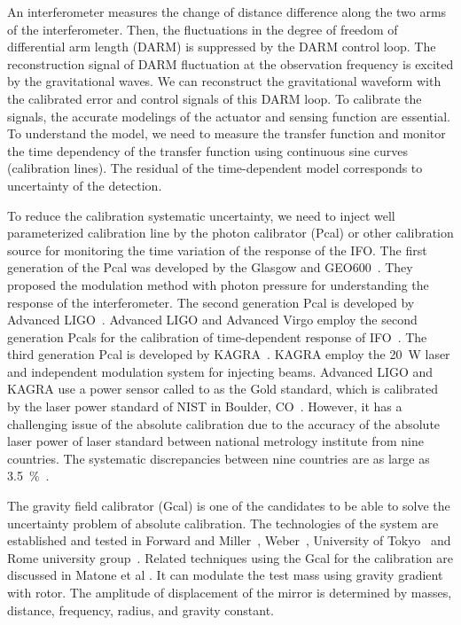 \documentclass[%
 reprint,
superscriptaddress,
 amsmath,amssymb,
 aps,
]{revtex4-1}
\begin{document}

An interferometer measures the change of distance difference along the two arms of the interferometer. Then, the fluctuations in the degree of freedom of differential arm length (DARM) is suppressed by the DARM control loop. The reconstruction signal of DARM fluctuation at the observation frequency is excited by the gravitational waves. We can reconstruct the gravitational waveform with the calibrated error and control signals of this DARM loop. To calibrate the signals, the accurate modelings of the actuator and sensing function are essential. To understand the model, we need to measure the transfer function and monitor the time dependency of the transfer function using continuous sine curves (calibration lines). The residual of the time-dependent model corresponds to uncertainty of the detection.

To reduce the calibration systematic uncertainty, we need to inject well parameterized calibration line by the photon calibrator (Pcal) or other calibration source for monitoring the time variation of the response of the IFO. The first generation of the Pcal was developed by the Glasgow and GEO600~\cite{CLUBLEY200185,MOSSAVI20061}. They proposed the modulation method with photon pressure for understanding the response of the interferometer. The second generation Pcal is developed by Advanced LIGO~\cite{doi:10.1063/1.4967303,0264-9381-27-8-084024,0264-9381-26-24-245011,0264-9381-32-2-024001}. Advanced LIGO and Advanced Virgo employ the second generation Pcals for the calibration of time-dependent response of IFO~\cite{0264-9381-32-2-024001}. The third generation Pcal is developed by KAGRA~\cite{KAGRA_Pcal}. KAGRA employ the 20~W laser and independent modulation system for injecting beams. Advanced LIGO and KAGRA use a power sensor called to as the Gold standard, which is calibrated by the laser power standard of NIST in Boulder, CO~\cite{taylor:1994:GEEU}. However, it has a challenging issue of the absolute calibration due to the accuracy of the absolute laser power of laser standard between national metrology institute from nine countries. The 
systematic discrepancies between nine countries are as large as 3.5~\%~\cite{EUROMET}.

The gravity field calibrator (Gcal) is one of the candidates to be able to solve the uncertainty problem of absolute calibration. The technologies of the system are established and tested in Forward and Miller~\cite{doi:10.1063/1.1709366}, Weber~\cite{PhysRevLett.18.795,PhysRev.167.1145}, University of Tokyo~\cite{Hirakawa,1347-4065-19-3-L123,1347-4065-20-7-L498,PhysRevD.26.729,PhysRevD.32.342} and Rome university group~\cite{Astone1991}. Related techniques using the Gcal for the calibration are discussed in Matone et al \cite{0264-9381-24-9-005}. It can modulate the test mass using gravity gradient with rotor. The amplitude of displacement of the mirror is determined by masses, distance, frequency, radius, and gravity constant. 
\end{document}
